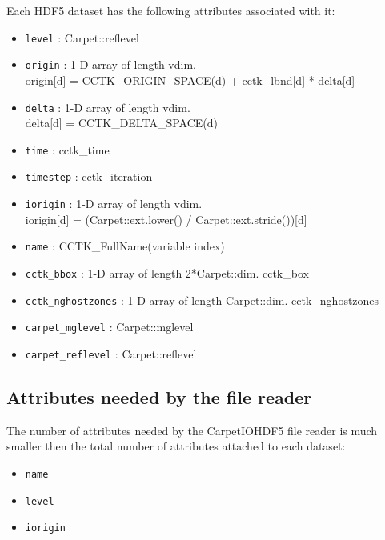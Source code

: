 \documentclass{article}
\begin{document}
Each HDF5 dataset has the following attributes associated with it:

\begin{itemize}
  \item {\tt level} : Carpet::reflevel
  \item {\tt origin} : 1-D array of length vdim. \\
        origin[d] = CCTK\_ORIGIN\_SPACE(d) + cctk\_lbnd[d] * delta[d]
  \item {\tt delta} : 1-D array of length vdim. \\
        delta[d] = CCTK\_DELTA\_SPACE(d)
  \item {\tt time} : cctk\_time
  \item {\tt timestep} : cctk\_iteration
  \item {\tt iorigin} : 1-D array of length vdim. \\ iorigin[d] = (Carpet::ext.lower() / Carpet::ext.stride())[d]
  \item {\tt name} : CCTK\_FullName(variable index)
  \item {\tt cctk\_bbox} : 1-D array of length 2*Carpet::dim. cctk\_box
  \item {\tt cctk\_nghostzones} : 1-D array of length Carpet::dim. cctk\_nghostzones
  \item {\tt carpet\_mglevel} : Carpet::mglevel
  \item {\tt carpet\_reflevel} : Carpet::reflevel
\end{itemize}


\subsection{Attributes needed by the file reader}

The number of attributes needed by the CarpetIOHDF5 file reader is much smaller then the total
number of attributes attached to each dataset:

\begin{itemize}
  \item {\tt name}
  \item {\tt level}
  \item {\tt iorigin}
\end{itemize}

\fi


\end{document}
